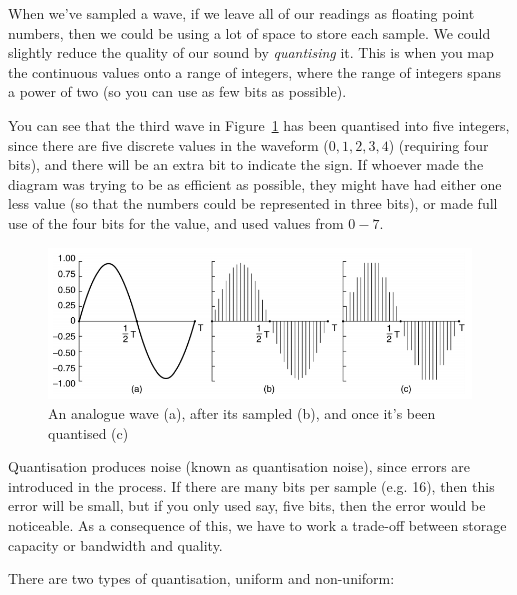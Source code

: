 When we've sampled a wave, if we leave all of our readings as floating point
numbers, then we could be using a lot of space to store each sample. We could
slightly reduce the quality of our sound by \textit{quantising} it. This is when
you map the continuous values onto a range of integers, where the range of
integers spans a power of two (so you can use as few bits as possible).

You can see that the third wave in Figure~\ref{quantised-wave} has been
quantised into five integers, since there are five discrete values in the
waveform ($0,1,2,3,4$) (requiring four bits), and there will be an extra bit to
indicate the sign. If whoever made the diagram was trying to be as efficient as
possible, they might have had either one less value (so that the numbers could
be represented in three bits), or made full use of the four bits for the value,
and used values from $0-7$.

\begin{figure}[ht]
  \centering
  \includegraphics[width=\textwidth]{images/quantised-wave}
  \caption{An analogue wave (a), after its sampled (b), and once it's been quantised (c)}
  \label{quantised-wave}
\end{figure}

Quantisation produces noise (known as quantisation noise), since errors are
introduced in the process. If there are many bits per sample (e.g. 16), then
this error will be small, but if you only used say, five bits, then the error
would be noticeable. As a consequence of this, we have to work a trade-off
between storage capacity or bandwidth and quality.

There are two types of quantisation, uniform and non-uniform:

